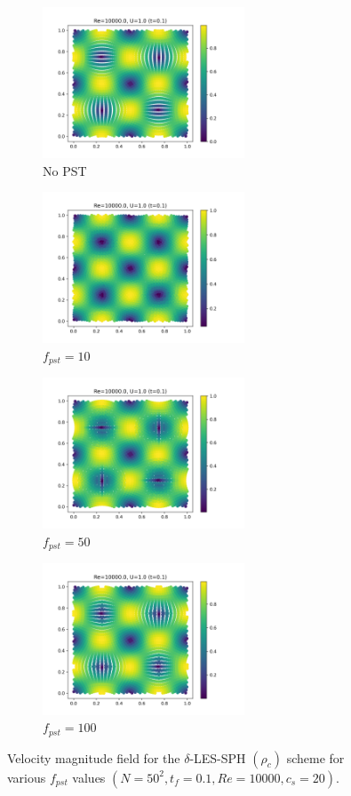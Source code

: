 \begin{figure}[htbp!]
  \begin{subfigure}{7cm}
    \centering\includegraphics[width=6cm]{Code-Figures/deltales/pst/c0_20_tait_pec_dtmul_1_nx_50_pst_-1_re_10000_deltales/final_vmag.png}
    \caption{No PST}
  \end{subfigure}
  \begin{subfigure}{7cm}
    \centering\includegraphics[width=6cm]{Code-Figures/deltales/pst/c0_20_tait_pec_dtmul_1_nx_50_pst_10_re_10000_deltales/final_vmag.png}
    \caption{$f_{pst} = 10$}
  \end{subfigure}
  \begin{subfigure}{7cm}
    \centering\includegraphics[width=6cm]{Code-Figures/deltales/pst/c0_20_tait_pec_dtmul_1_nx_50_pst_50_re_10000_deltales/final_vmag.png}
    \caption{$f_{pst} = 50$}
  \end{subfigure}
  \begin{subfigure}{7cm}
    \centering\includegraphics[width=6cm]{Code-Figures/deltales/pst/c0_20_tait_pec_dtmul_1_nx_50_pst_100_re_10000_deltales/final_vmag.png}
    \caption{$f_{pst} = 100$}
  \end{subfigure}
  \caption{Velocity magnitude field for the $\delta$-LES-SPH $(\rho_c)$ scheme for various $f_{pst}$ values $(N=50^2, t_f=0.1, Re=10000, c_s=20)$.}
  \label{fig:deltales-pst-vmag}
\end{figure}


